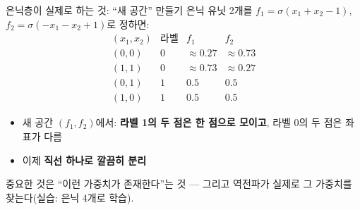 \begin{frame}{은닉층이 실제로 하는 것: ``새 공간'' 만들기}
  \small
  은닉 유닛 2개를 $f_1 = \sigma(x_1 + x_2 - 1)$, $f_2 = \sigma(-x_1 - x_2 + 1)$로 정하면:
  \[
  \begin{array}{c|c|cc}
  (x_1,x_2) & \text{라벨} & f_1 & f_2 \\ \hline
  (0,0) & 0 & \approx 0.27 & \approx 0.73 \\
  (1,1) & 0 & \approx 0.73 & \approx 0.27 \\
  (0,1) & 1 & 0.5 & 0.5 \\
  (1,0) & 1 & 0.5 & 0.5
  \end{array}
  \]
  \begin{itemize}
    \item 새 공간 $(f_1, f_2)$에서: \textbf{라벨 1의 두 점은 한 점으로 모이고},
      라벨 0의 두 점은 좌표가 다름
    \item 이제 \textbf{직선 하나로 깔끔히 분리}
  \end{itemize}
  {\footnotesize 중요한 것은 ``이런 가중치가 존재한다''는 것 —
  그리고 역전파가 실제로 그 가중치를 찾는다(실습: 은닉 4개로 학습).}
\end{frame}
